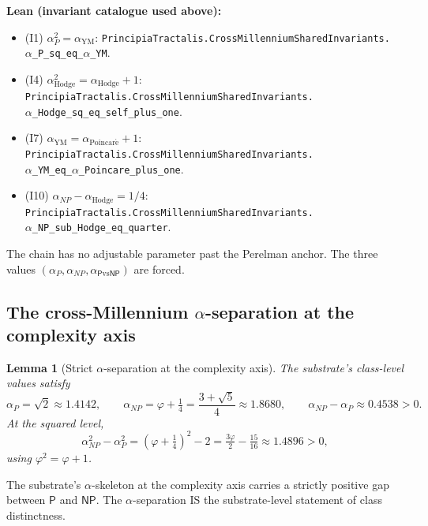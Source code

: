 \documentclass[11pt,a4paper]{article}
\theoremstyle{plain}
\newtheorem{lemma}[theorem]{Lemma}
\theoremstyle{definition}
\begin{document}
\noindent\textbf{Lean (invariant catalogue used above):}
\begin{itemize}[leftmargin=*,nosep]
\item (I1) $\alpha_{P}^{2} = \alpha_{\mathrm{YM}}$:
  \texttt{PrincipiaTractalis.CrossMillenniumSharedInvariants.\\
  $\alpha$\_P\_sq\_eq\_$\alpha$\_YM}.
\item (I4) $\alpha_{\mathrm{Hodge}}^{2} = \alpha_{\mathrm{Hodge}} + 1$:
  \texttt{PrincipiaTractalis.CrossMillenniumSharedInvariants.\\
  $\alpha$\_Hodge\_sq\_eq\_self\_plus\_one}.
\item (I7) $\alpha_{\mathrm{YM}} = \alpha_{\mathrm{Poincar\acute e}} + 1$:
  \texttt{PrincipiaTractalis.CrossMillenniumSharedInvariants.\\
  $\alpha$\_YM\_eq\_$\alpha$\_Poincare\_plus\_one}.
\item (I10) $\alpha_{NP} - \alpha_{\mathrm{Hodge}} = 1/4$:
  \texttt{PrincipiaTractalis.CrossMillenniumSharedInvariants.\\
  $\alpha$\_NP\_sub\_Hodge\_eq\_quarter}.
\end{itemize}

The chain has no adjustable parameter past the Perelman anchor. The
three values $(\alpha_{P}, \alpha_{NP},
\alpha_{\mathsf{P}\mathrm{vs}\mathsf{NP}})$ are forced.

\subsection{The cross-Millennium $\alpha$-separation at the complexity
axis}
\label{sec:alpha-separation}

\begin{lemma}[Strict $\alpha$-separation at the complexity axis]
\label{lem:strict-separation}
The substrate's class-level values satisfy
\[
\alpha_{P} = \sqrt{2}
\approx 1.4142,\qquad
\alpha_{NP} = \varphi + \tfrac{1}{4} = \frac{3 + \sqrt{5}}{4}
\approx 1.8680,\qquad
\alpha_{NP} - \alpha_{P} \approx 0.4538 > 0.
\]
At the squared level,
\[
\alpha_{NP}^{2} - \alpha_{P}^{2}
= (\varphi + \tfrac{1}{4})^{2} - 2
= \tfrac{3\varphi}{2} - \tfrac{15}{16}
\approx 1.4896 > 0,
\]
using $\varphi^{2} = \varphi + 1$.
\end{lemma}

The substrate's $\alpha$-skeleton at the complexity axis carries a
strictly positive gap between $\mathsf{P}$ and $\mathsf{NP}$. The
$\alpha$-separation IS the substrate-level statement of class
distinctness.
\end{document}
